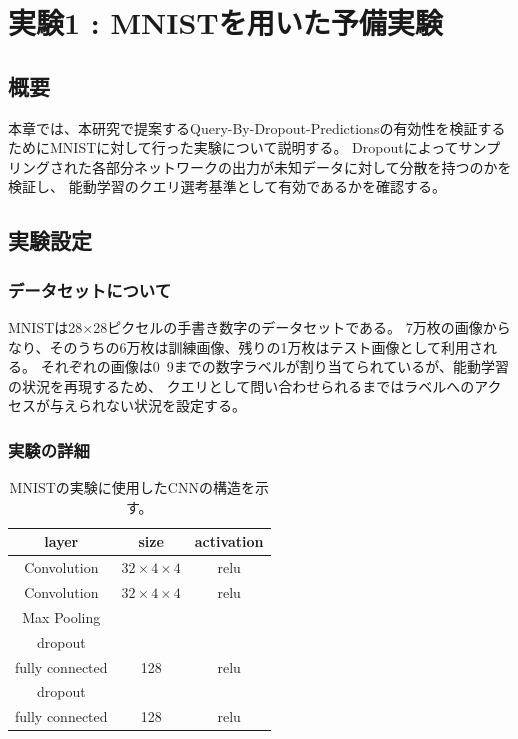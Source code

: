 \chapter{実験1 : MNISTを用いた予備実験}

\section{概要}
本章では、本研究で提案するQuery-By-Dropout-Predictionsの有効性を検証するためにMNISTに対して行った実験について説明する。
Dropoutによってサンプリングされた各部分ネットワークの出力が未知データに対して分散を持つのかを検証し、
能動学習のクエリ選考基準として有効であるかを確認する。


\section{実験設定}

\subsection{データセットについて}
MNISTは28×28ピクセルの手書き数字のデータセットである。
7万枚の画像からなり、そのうちの6万枚は訓練画像、残りの1万枚はテスト画像として利用される。
それぞれの画像は0~9までの数字ラベルが割り当てられているが、能動学習の状況を再現するため、
クエリとして問い合わせられるまではラベルへのアクセスが与えられない状況を設定する。


\subsection{実験の詳細}

\begin{table}[h]
    \label{table:mnist_cnn}
    \caption{MNISTの実験に使用したCNNの構造を示す。}
    \center
    \begin{tabular}{|c|c|c|} \hline
        layer & size & activation \\ \hline
        Convolution & $32 \times 4 \times 4$ & relu \\
        Convolution & $32 \times 4 \times 4$ & relu \\
        Max Pooling & & \\
        dropout & & \\
        fully connected & 128 & relu \\
        dropout & & \\
        fully connected & 128 & relu \\
        \hline
    \end{tabular}
  \end{table}

